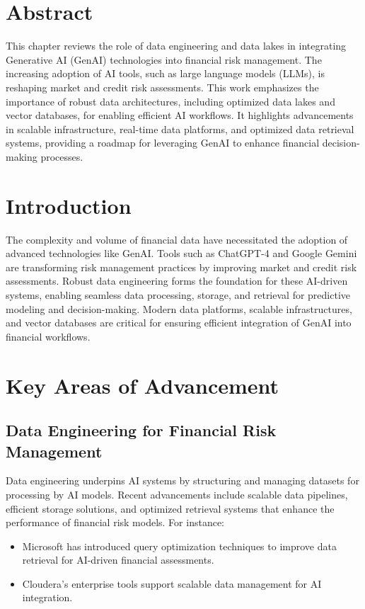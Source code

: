 \documentclass[a4paper,headinclude=on,footinclude=on,12pt,oneside]{scrbook}
\begin{document}
\section*{Abstract}
This chapter reviews the role of data engineering and data lakes in integrating Generative AI (GenAI) technologies into financial risk management. The increasing adoption of AI tools, such as large language models (LLMs), is reshaping market and credit risk assessments. This work emphasizes the importance of robust data architectures, including optimized data lakes and vector databases, for enabling efficient AI workflows. It highlights advancements in scalable infrastructure, real-time data platforms, and optimized data retrieval systems, providing a roadmap for leveraging GenAI to enhance financial decision-making processes.

\section{Introduction}
The complexity and volume of financial data have necessitated the adoption of advanced technologies like GenAI. Tools such as ChatGPT-4 and Google Gemini are transforming risk management practices by improving market and credit risk assessments. Robust data engineering forms the foundation for these AI-driven systems, enabling seamless data processing, storage, and retrieval for predictive modeling and decision-making. Modern data platforms, scalable infrastructures, and vector databases are critical for ensuring efficient integration of GenAI into financial workflows.

\section{Key Areas of Advancement}
\subsection{Data Engineering for Financial Risk Management}
Data engineering underpins AI systems by structuring and managing datasets for processing by AI models. Recent advancements include scalable data pipelines, efficient storage solutions, and optimized retrieval systems that enhance the performance of financial risk models. For instance:
\begin{itemize}
	\item Microsoft has introduced query optimization techniques to improve data retrieval for AI-driven financial assessments.
	\item Cloudera's enterprise tools support scalable data management for AI integration.
\end{itemize}
\end{document}
